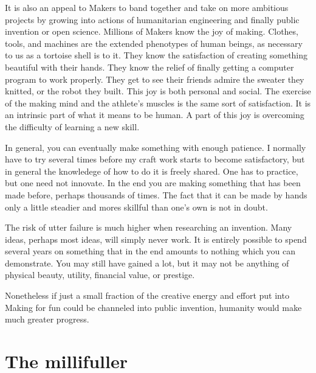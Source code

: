 \documentclass[
	fontsize=10pt, %
	twoside=false, %
	secnumdepth=1, %
]{kaobook}
\begin{document}
It is also an appeal to Makers to band together and
take on more ambitious projects by growing into
actions of humanitarian engineering and finally public invention
or open science.
Millions of Makers know the joy of making.
Clothes, tools, and machines are the extended phenotypes of human beings,
as necessary to us as a tortoise shell is to it.
They know the satisfaction of creating something beautiful with
their hands.
They know the relief of finally getting a computer program to work
properly.
They get to see their friends admire the sweater they knitted,
or the robot they built.
This joy is both personal and social.
The exercise of the making mind and the athlete's muscles is
the same sort of satisfaction.
It is an intrinsic part of what it means to be human.
A part of this joy is overcoming the difficulty of learning
a new skill.

In general, you can eventually make something with enough
patience. I normally have to try several times before my
craft work starts to become satisfactory, but in general
the knowledege of how to do it is freely shared.
One has to practice, but one need not innovate.
In the end you are making something that has been made
before, perhaps thousands of times.
The fact that it can be made by hands only a little
steadier and mores skillful than one's own is not in doubt.

The risk of utter failure is much higher when researching
an invention.
Many ideas, perhaps most ideas, will simply never work.
It is entirely possible to spend several years on something
that in the end amounts to nothing which you can demonstrate.
You may still have gained a lot, but
it may not be anything of physical beauty, utility, financial value,
or prestige.

Nonetheless if just a small fraction of the creative energy
and effort put into Making for fun could be channeled into
public invention, humanity would make much greater progress.

\chapter{The millifuller}
\end{document}

